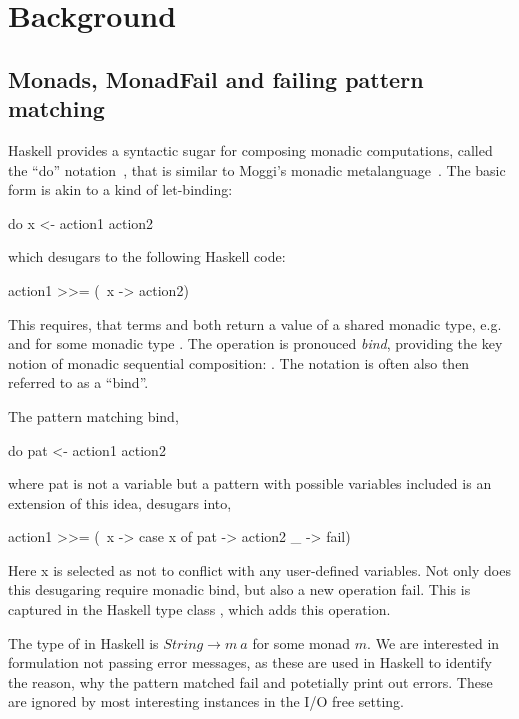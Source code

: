 \documentclass[10pt]{article}
\theoremstyle{definition}
\theoremstyle{remark}
\begin{document}
\section{Background} %
%
\subsection{Monads, MonadFail and failing pattern matching}
%
Haskell provides a syntactic sugar for composing monadic computations,
called the ``do'' notation~\cite{jones2003haskell}, that is similar to Moggi's monadic
metalanguage~\cite{moggi1991notions}. The basic form is akin to a kind
of let-binding:
%
\begin{haskell}
     do
	x <- action1
	action2
\end{haskell}
%
which desugars to the following Haskell code:
%
\begin{haskell}
    action1 >>= (\ x -> action2)
\end{haskell}
%
This requires, that terms  and  both return
a value of a shared monadic type, e.g.  and
 for some monadic type . The
\haskin{>>=} operation is pronouced \emph{bind}, providing the key
notion of monadic sequential composition: . The notation  is often also then
referred to as a ``bind''.

The pattern matching bind,
%
\begin{haskell}
     do
	pat <- action1
	action2
\end{haskell}
%
where pat is not a variable but a pattern
with possible variables included is an extension of this
idea,
desugars into,
%
\begin{haskell}
    action1 >>= (\ x -> case x of
	             pat -> action2
		     _ -> fail)
\end{haskell}
%

Here x is selected as not to conflict with any user-defined variables. Not only does this desugaring require monadic bind, but also a new operation fail.
This is captured in the Haskell type class , which adds this
operation.

The type of  in Haskell is $String \rightarrow m\:a$ for some monad
$m$. We are interested in formulation not passing error
messages, as these are used in Haskell to identify the reason, why the pattern matched fail and potetially print out errors. These are ignored by most interesting instances in the I/O free setting.
\end{document}
